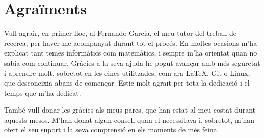 \chapter*{Agraïments}
Vull agrair, en primer lloc, al Fernando Garcia, el meu tutor del treball de recerca, per haver-me acompanyat durant tot el procés. En moltes ocasions m'ha explicat tant temes informàtics com matemàtics, i sempre m'ha orientat quan no sabia com continuar. Gràcies a la seva ajuda he pogut avançar amb més seguretat i aprendre molt, sobretot en les eines utilitzades, com ara \LaTeX, Git o Linux, que desconeixia abans de començar. Estic molt agraït per tota la dedicació i el temps que m'ha dedicat.

També vull donar les gràcies als meus pares, que han estat al meu costat durant aquests mesos. M'han donat algun consell quan el necessitava i, sobretot, m'han ofert el seu suport i la seva comprensió en els moments de més feina.
